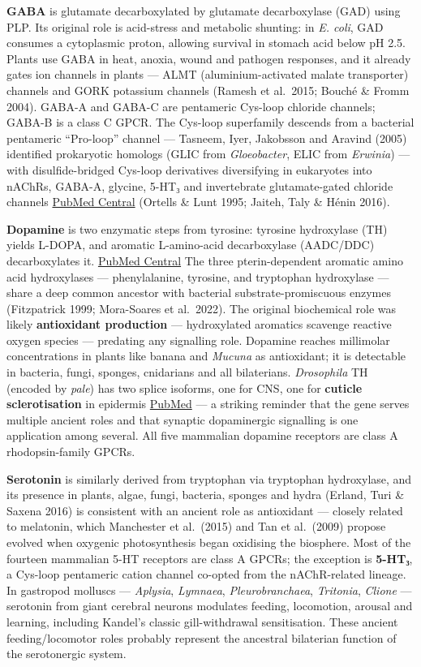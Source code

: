 \textbf{GABA} is glutamate decarboxylated by glutamate decarboxylase (GAD) using PLP. Its original role is acid-stress and metabolic shunting: in \emph{E. coli}, GAD consumes a cytoplasmic proton, allowing survival in stomach acid below pH 2.5. Plants use GABA in heat, anoxia, wound and pathogen responses, and it already gates ion channels in plants --- ALMT (aluminium-activated malate transporter) channels and GORK potassium channels (Ramesh et al.~2015; Bouché \& Fromm 2004). GABA-A and GABA-C are pentameric Cys-loop chloride channels; GABA-B is a class C GPCR. The Cys-loop superfamily descends from a bacterial pentameric ``Pro-loop'' channel --- Tasneem, Iyer, Jakobsson and Aravind (2005) identified prokaryotic homologs (GLIC from \emph{Gloeobacter}, ELIC from \emph{Erwinia}) --- with disulfide-bridged Cys-loop derivatives diversifying in eukaryotes into nAChRs, GABA-A, glycine, 5-HT₃ and invertebrate glutamate-gated chloride channels \href{https://pmc.ncbi.nlm.nih.gov/articles/PMC10480131/}{PubMed Central} (Ortells \& Lunt 1995; Jaiteh, Taly \& Hénin 2016).

\textbf{Dopamine} is two enzymatic steps from tyrosine: tyrosine hydroxylase (TH) yields L-DOPA, and aromatic L-amino-acid decarboxylase (AADC/DDC) decarboxylates it. \href{https://pmc.ncbi.nlm.nih.gov/articles/PMC3065393/}{PubMed Central} The three pterin-dependent aromatic amino acid hydroxylases --- phenylalanine, tyrosine, and tryptophan hydroxylase --- share a deep common ancestor with bacterial substrate-promiscuous enzymes (Fitzpatrick 1999; Mora-Soares et al.~2022). The original biochemical role was likely \textbf{antioxidant production} --- hydroxylated aromatics scavenge reactive oxygen species --- predating any signalling role. Dopamine reaches millimolar concentrations in plants like banana and \emph{Mucuna} as antioxidant; it is detectable in bacteria, fungi, sponges, cnidarians and all bilaterians. \emph{Drosophila} TH (encoded by \emph{pale}) has two splice isoforms, one for CNS, one for \textbf{cuticle sclerotisation} in epidermis \href{https://pubmed.ncbi.nlm.nih.gov/10358021/}{PubMed} --- a striking reminder that the gene serves multiple ancient roles and that synaptic dopaminergic signalling is one application among several. All five mammalian dopamine receptors are class A rhodopsin-family GPCRs.

\textbf{Serotonin} is similarly derived from tryptophan via tryptophan hydroxylase, and its presence in plants, algae, fungi, bacteria, sponges and hydra (Erland, Turi \& Saxena 2016) is consistent with an ancient role as antioxidant --- closely related to melatonin, which Manchester et al.~(2015) and Tan et al.~(2009) propose evolved when oxygenic photosynthesis began oxidising the biosphere. Most of the fourteen mammalian 5-HT receptors are class A GPCRs; the exception is \textbf{5-HT₃}, a Cys-loop pentameric cation channel co-opted from the nAChR-related lineage. In gastropod molluscs --- \emph{Aplysia}, \emph{Lymnaea}, \emph{Pleurobranchaea}, \emph{Tritonia}, \emph{Clione} --- serotonin from giant cerebral neurons modulates feeding, locomotion, arousal and learning, including Kandel's classic gill-withdrawal sensitisation. These ancient feeding/locomotor roles probably represent the ancestral bilaterian function of the serotonergic system.


